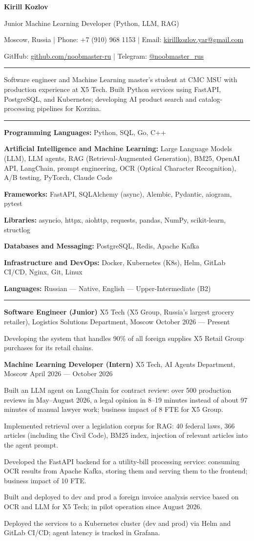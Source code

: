 \documentclass[10pt,a4paper]{article}
\newcommand{\cvsection}[1]{%
  \vspace{5pt}{\large\bfseries #1}\par\vspace{2pt}\hrule\vspace{4pt}}
\newcommand{\cventry}[3]{%
  \textbf{#1} \textbar{} #3 \textbar{} #2\par\vspace{1pt}}
\newcommand{\skilllangs}{\textbf{Programming Languages:} Python, SQL, Go, C++\par}
\newcommand{\skillai}{\textbf{Artificial Intelligence and Machine Learning:} Large Language Models (LLM),
LLM agents, RAG (Retrieval-Augmented Generation), BM25, OpenAI API, LangChain, prompt engineering,
OCR (Optical Character Recognition), A/B testing, PyTorch, Claude Code\par}
\newcommand{\skillframeworks}{\textbf{Frameworks:} FastAPI, SQLAlchemy (async), Alembic, Pydantic, aiogram, pytest\par}
\newcommand{\skilllibs}{\textbf{Libraries:} asyncio, httpx, aiohttp, requests, pandas, NumPy, scikit-learn, structlog\par}
\newcommand{\skilldb}{\textbf{Databases and Messaging:} PostgreSQL, Redis, Apache Kafka\par}
\newcommand{\skillinfra}{\textbf{Infrastructure and DevOps:} Docker, Kubernetes (K8s), Helm, GitLab CI/CD, Nginx, Git, Linux\par}
\newcommand{\skillhuman}{\textbf{Languages:} Russian --- Native, English --- Upper-Intermediate (B2)}
\begin{document}
{\LARGE\bfseries Kirill Kozlov}\par\vspace{3pt}
Junior Machine Learning Developer (Python, LLM, RAG)\par\vspace{3pt}
Moscow, Russia | Phone: +7 (910) 968 1153 | Email: \href{mailto:kirillkozlov.yar@gmail.com}{kirillkozlov.yar@gmail.com}\par
GitHub: \href{https://github.com/noobmaster-ru}{github.com/noobmaster-ru} | Telegram: \href{https://t.me/noobmaster_rus}{@noobmaster\_rus}

\cvsection{Professional Summary}
Software engineer and Machine Learning master's student at CMC MSU with production experience at X5 Tech. Built Python services using FastAPI, PostgreSQL, and Kubernetes; developing AI product search and catalog-processing pipelines for Korzina.

\cvsection{Technical Skills}
\skilllangs
\skillai\skillframeworks\skilllibs\skilldb\skillinfra
\skillhuman

\cvsection{Work Experience}
\cventry{Software Engineer (Junior)}{October 2026 --- Present}{X5 Tech (X5 Group, Russia's largest grocery retailer), Logistics Solutions Department, Moscow}
\begin{cvitems}
    \item Developing the system that handles 90\% of all foreign supplies X5 Retail Group purchases for its retail chains.
\end{cvitems}
\vspace{2pt}

\cventry{Machine Learning Developer (Intern)}{April 2026 --- October 2026}{X5 Tech, AI Agents Department, Moscow}
\begin{cvitems}
%
    \item Built an LLM agent on LangChain for contract review: over 500 production reviews in May--August 2026, a legal opinion in 8--19 minutes instead of about 97 minutes of manual lawyer work; business impact of 8 FTE for X5 Group.
    \item Implemented retrieval over a legislation corpus for RAG: 40 federal laws, 366 articles (including the Civil Code), BM25 index, injection of relevant articles into the agent prompt.
    \item Developed the FastAPI backend for a utility-bill processing service: consuming OCR results from Apache Kafka, storing them and serving them to the frontend; business impact of 10 FTE.
    \item Built and deployed to dev and prod a foreign invoice analysis service based on OCR and LLM for X5 Tech; in pilot operation since August 2026.
    \item Deployed the services to a Kubernetes cluster (dev and prod) via Helm and GitLab CI/CD; agent latency is tracked in Grafana.%

\end{cvitems}
\end{document}
